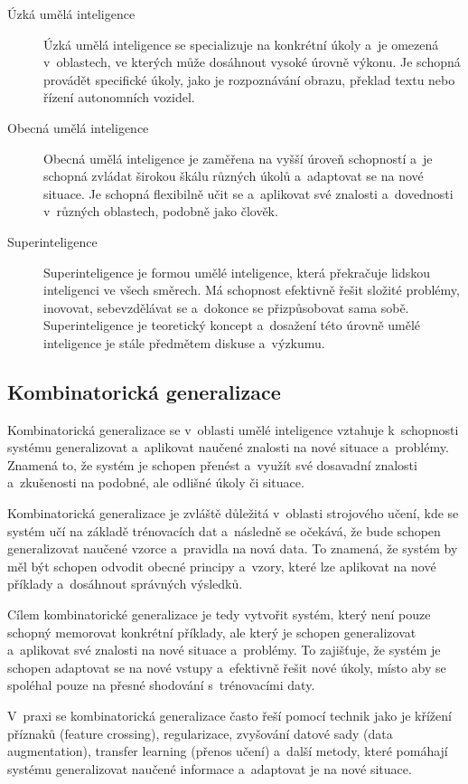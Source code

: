 \begin{description}
    \item[Úzká umělá inteligence] Úzká umělá inteligence se specializuje na konkrétní úkoly a~je omezená v~oblastech, ve kterých může dosáhnout vysoké úrovně výkonu. Je schopná provádět specifické úkoly, jako je rozpoznávání obrazu, překlad textu nebo řízení autonomních vozidel.
    \item[Obecná umělá inteligence] Obecná umělá inteligence je zaměřena na vyšší úroveň schopností a~je schopná zvládat širokou škálu různých úkolů a~adaptovat se na nové situace. Je schopná flexibilně učit se a~aplikovat své znalosti a~dovednosti v~různých oblastech, podobně jako člověk.
    \item[Superinteligence] Superinteligence je formou umělé inteligence, která překračuje lidskou inteligenci ve všech směrech. Má schopnost efektivně řešit složité problémy, inovovat, sebevzdělávat se a~dokonce se přizpůsobovat sama sobě. Superinteligence je teoretický koncept a~dosažení této úrovně umělé inteligence je stále předmětem diskuse a~výzkumu.
\end{description}

\subsection{Kombinatorická generalizace}

Kombinatorická generalizace se v~oblasti umělé inteligence vztahuje k~schopnosti systému generalizovat a~aplikovat naučené znalosti na nové situace a~problémy. Znamená to, že systém je schopen přenést a~využít své dosavadní znalosti a~zkušenosti na podobné, ale odlišné úkoly či situace.

Kombinatorická generalizace je zvláště důležitá v~oblasti strojového učení, kde se systém učí na základě trénovacích dat a~následně se očekává, že bude schopen generalizovat naučené vzorce a~pravidla na nová data. To znamená, že systém by měl být schopen odvodit obecné principy a~vzory, které lze aplikovat na nové příklady a~dosáhnout správných výsledků.

Cílem kombinatorické generalizace je tedy vytvořit systém, který není pouze schopný memorovat konkrétní příklady, ale který je schopen generalizovat a~aplikovat své znalosti na nové situace a~problémy. To zajišťuje, že systém je schopen adaptovat se na nové vstupy a~efektivně řešit nové úkoly, místo aby se spoléhal pouze na přesné shodování s~trénovacími daty.

V~praxi se kombinatorická generalizace často řeší pomocí technik jako je křížení příznaků (feature crossing), regularizace, zvyšování datové sady (data augmentation), transfer learning (přenos učení) a~další metody, které pomáhají systému generalizovat naučené informace a~adaptovat je na nové situace.

